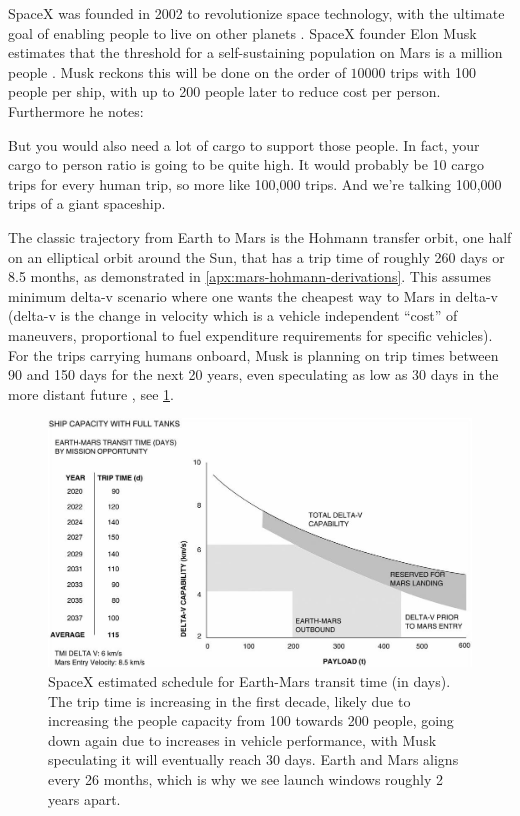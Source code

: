 SpaceX was founded in 2002 to revolutionize space technology, with the ultimate goal of enabling people to live on other planets \cite{SpaceXb}. SpaceX founder Elon Musk estimates that the threshold for a self-sustaining population on Mars is a million people \cite{Musk}. Musk reckons this will be done on the order of $10000$ trips with 100 people per ship, with up to 200 people later to reduce cost per person. Furthermore he notes:

\begin{displayquote}
But you would also need a lot of cargo to support those people. In fact, your cargo to person ratio is going to be quite high. It would probably be 10 cargo trips for every human trip, so more like 100,000 trips. And we’re talking 100,000 trips of a giant spaceship.
\end{displayquote}

The classic trajectory from Earth to Mars is the Hohmann transfer orbit, one half on an elliptical orbit around the Sun, that has a trip time of roughly 260 days or 8.5 months, as demonstrated in \cref{apx:mars-hohmann-derivations}. This assumes minimum delta-v scenario where one wants the cheapest way to Mars in delta-v (delta-v is the change in velocity which is a vehicle independent ``cost'' of maneuvers, proportional to fuel expenditure requirements for specific vehicles). For the trips carrying humans onboard, Musk is planning on trip times between 90 and 150 days for the next 20 years, even speculating as low as 30 days in the more distant future \cite{Musk}, see \cref{fig:musk-trip-time}.

\begin{figure}[ht]
	\centering
	\includegraphics[width=1.0\linewidth]{fig/musk-trip-time.jpg}
	\caption{SpaceX estimated schedule for Earth-Mars transit time (in days). The trip time is increasing in the first decade, likely due to increasing the people capacity from 100 towards 200 people, going down again due to increases in vehicle performance, with Musk speculating it will eventually reach 30 days. Earth and Mars aligns every 26 months, which is why we see launch windows roughly 2 years apart.}
	\label{fig:musk-trip-time}
\end{figure}


